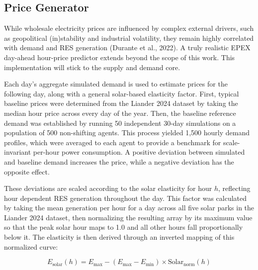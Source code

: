 \documentclass[11pt, a4paper]{article}
\begin{document}
\subsection{Price Generator} \label{subs:price}

While wholesale electricity prices are influenced by complex external drivers, such as geopolitical (in)stability and industrial volatility, they remain highly correlated with demand and RES generation (Durante et al., 2022). A truly realistic EPEX day-ahead hour-price predictor extends beyond the scope of this work. This implementation will stick to the supply and demand core. 
 
Each day's aggregate simulated demand is used to estimate prices for the following day, along with a general solar-based elasticity factor. First, typical baseline prices were determined from the Liander 2024 dataset by taking the median hour price across every day of the year. Then, the baseline reference demand was established by running 50 independent 30-day simulations on a population of 500 non-shifting agents. This process yielded 1,500 hourly demand profiles, which were averaged to each agent to provide a benchmark for scale-invariant per-hour power consumption. A positive deviation between simulated and baseline demand increases the price, while a negative deviation has the opposite effect. 

These deviations are scaled according to the solar elasticity for hour $h$, reflecting hour dependent RES generation throughout the day. This factor was calculated by taking the mean generation per hour for a day across all five solar parks in the Liander 2024 dataset, then normalizing the resulting array by its maximum value so that the peak solar hour maps to 1.0 and all other hours fall proportionally below it. The elasticity is then derived through an inverted mapping of this normalized curve:

\begin{equation}
    E_{\text{solar}}(h) = E_{\text{max}} - (E_{\text{max}} - E_{\text{min}}) \times \text{Solar}_{\text{norm}}(h)
\end{equation}
\end{document}
